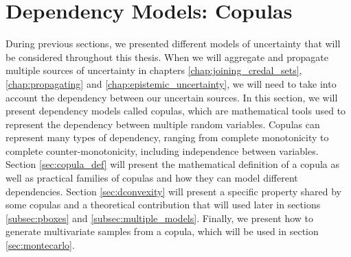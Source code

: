 \section{Dependency Models: Copulas}\label{sec:copulas}
During previous sections, we presented different models of uncertainty that will be considered throughout this thesis. When we will aggregate and propagate multiple sources of uncertainty in chapters \ref{chap:joining_credal_sets}, \ref{chap:propagating} and \ref{chap:epistemic_uncertainty}, we will need to take into account the dependency between our uncertain sources. In this section, we will present dependency models called copulas, which are mathematical tools used to represent the dependency between multiple random variables. Copulas can represent many types of dependency, ranging from complete monotonicity to complete counter-monotonicity, including independence between variables. Section \ref{sec:copula_def} will present the mathematical definition of a copula as well as practical families of copulas and how they can model different dependencies. Section \ref{sec:dconvexity} will present a specific property shared by some copulas and a theoretical contribution that will used later in sections \ref{subsec:pboxes} and \ref{subsec:multiple_models}. Finally, we present how to generate multivariate samples from a copula, which will be used in section \ref{sec:montecarlo}.

